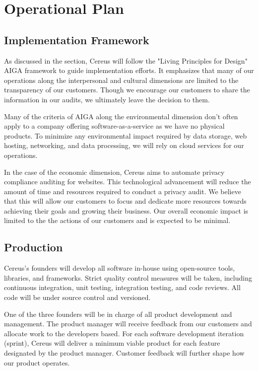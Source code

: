 {\let\cleardoublepage\relax \chapter{Operational Plan}}

\section{Implementation Framework}

As discussed in the  section, Cereus will follow the "Living Principles for Design" AIGA framework \cite{brink.aiga.2020} to guide implementation efforts. It emphasizes that many of our operations along the interpersonal and cultural dimensions are limited to the transparency of our customers. Though we encourage our customers to share the information in our audits, we ultimately leave the decision to them.

Many of the criteria of AIGA along the environmental dimension don't often apply to a company offering software-as-a-service as we have no physical products. To minimize any environmental impact required by data storage, web hosting, networking, and data processing, we will rely on cloud services for our operations.

In the case of the economic dimension, Cereus aims to automate privacy compliance auditing for websites. This technological advancement will reduce the amount of time and resources required to conduct a privacy audit. We believe that this will allow our customers to focus and dedicate more resources towards achieving their goals and growing their business. Our overall economic impact is limited to the the actions of our customers and is expected to be minimal.

\section{Production}

Cereus's founders will develop all software in-house using open-source tools, libraries, and frameworks. Strict quality control measures will be taken, including continuous integration, unit testing, integration testing, and code reviews. All code will be under source control and versioned.

One of the three founders will be in charge of all product development and management. The product manager will receive feedback from our customers and allocate work to the developers based. For each software development iteration (sprint), Cereus will deliver a minimum viable product for each feature designated by the product manager. Customer feedback will further shape how our product operates.

